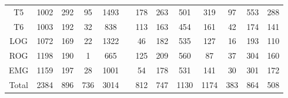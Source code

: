 \begin{SidewaysFigure}
\begin{tabular}{c|ccccc|cccc|ccc}
T5 &1002&292&95&1493&&178&263&501&319&97&553&288 \\
T6 &1003&192&32&838&&113&163&454&161&42&174&141 \\
LOG &1072&169&22&1322&&46&182&535&127&16&193&110 \\
ROG &1198&190&1&665&&125&209&560&87&37&304&160 \\
EMG &1159&197&28&1001&&54&178&531&141&30&301&172 \\
\hline
Total&2384&896&736&3014&&812&747&1130&1174&383&864&508
\end{tabular}
\caption{Total  de \'epocas PE dentro del registro pero que no fueron clasificadas
como MOR (fases W y N) para cada
canal. %
}
\label{total_gpos_nmor}
\end{SidewaysFigure}

